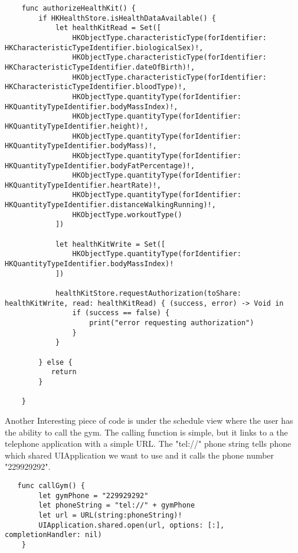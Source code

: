 \documentclass[a4paper]{article}
\begin{document}
\begin{verbatim}
    func authorizeHealthKit() {
        if HKHealthStore.isHealthDataAvailable() {
            let healthKitRead = Set([
                HKObjectType.characteristicType(forIdentifier: HKCharacteristicTypeIdentifier.biologicalSex)!,
                HKObjectType.characteristicType(forIdentifier: HKCharacteristicTypeIdentifier.dateOfBirth)!,
                HKObjectType.characteristicType(forIdentifier: HKCharacteristicTypeIdentifier.bloodType)!,
                HKObjectType.quantityType(forIdentifier: HKQuantityTypeIdentifier.bodyMassIndex)!,
                HKObjectType.quantityType(forIdentifier: HKQuantityTypeIdentifier.height)!,
                HKObjectType.quantityType(forIdentifier: HKQuantityTypeIdentifier.bodyMass)!,
                HKObjectType.quantityType(forIdentifier: HKQuantityTypeIdentifier.bodyFatPercentage)!,
                HKObjectType.quantityType(forIdentifier: HKQuantityTypeIdentifier.heartRate)!,
                HKObjectType.quantityType(forIdentifier: HKQuantityTypeIdentifier.distanceWalkingRunning)!,
                HKObjectType.workoutType()
            ])

            let healthKitWrite = Set([
                HKObjectType.quantityType(forIdentifier: HKQuantityTypeIdentifier.bodyMassIndex)!
            ])

            healthKitStore.requestAuthorization(toShare: healthKitWrite, read: healthKitRead) { (success, error) -> Void in
                if (success == false) {
                    print("error requesting authorization")
                }
            }

        } else {
           return
        }

    }

\end{verbatim}

Another Interesting piece of code is under the schedule view where the user has the ability to call the gym. The calling function is simple, but it links to a the telephone application with a simple URL. The "tel://" phone string tells phone which shared UIApplication we want to use and it calls the phone number "229929292".

\begin{verbatim}
   func callGym() {
        let gymPhone = "229929292"
        let phoneString = "tel://" + gymPhone
        let url = URL(string:phoneString)!
        UIApplication.shared.open(url, options: [:], completionHandler: nil)
    }
\end{verbatim}
\end{document}
